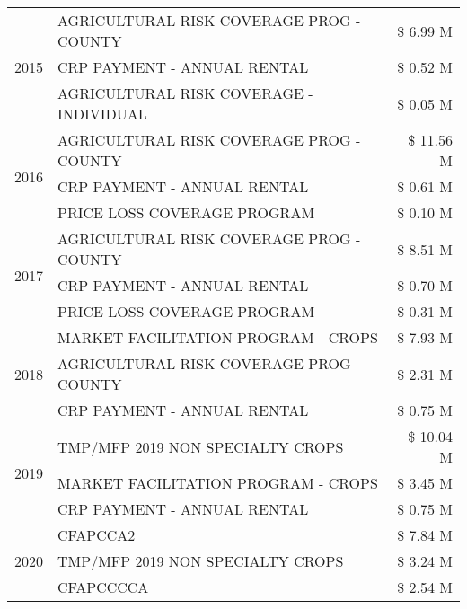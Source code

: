\begin{tabular}{llr}
\cline{1-3}
\multirow[t]{3}{*}{2015} & AGRICULTURAL RISK COVERAGE PROG - COUNTY & \$ 6.99 M \\
 & CRP PAYMENT - ANNUAL RENTAL & \$ 0.52 M \\
 & AGRICULTURAL RISK COVERAGE - INDIVIDUAL & \$ 0.05 M \\
\cline{1-3}
\multirow[t]{3}{*}{2016} & AGRICULTURAL RISK COVERAGE PROG - COUNTY & \$ 11.56 M \\
 & CRP PAYMENT - ANNUAL RENTAL & \$ 0.61 M \\
 & PRICE LOSS COVERAGE PROGRAM & \$ 0.10 M \\
\cline{1-3}
\multirow[t]{3}{*}{2017} & AGRICULTURAL RISK COVERAGE PROG - COUNTY & \$ 8.51 M \\
 & CRP PAYMENT - ANNUAL RENTAL & \$ 0.70 M \\
 & PRICE LOSS COVERAGE PROGRAM & \$ 0.31 M \\
\cline{1-3}
\multirow[t]{3}{*}{2018} & MARKET FACILITATION PROGRAM - CROPS & \$ 7.93 M \\
 & AGRICULTURAL RISK COVERAGE PROG - COUNTY & \$ 2.31 M \\
 & CRP PAYMENT - ANNUAL RENTAL & \$ 0.75 M \\
\cline{1-3}
\multirow[t]{3}{*}{2019} & TMP/MFP 2019 NON SPECIALTY CROPS & \$ 10.04 M \\
 & MARKET FACILITATION PROGRAM - CROPS & \$ 3.45 M \\
 & CRP PAYMENT - ANNUAL RENTAL & \$ 0.75 M \\
\cline{1-3}
\multirow[t]{3}{*}{2020} & CFAPCCA2 & \$ 7.84 M \\
 & TMP/MFP 2019 NON SPECIALTY CROPS & \$ 3.24 M \\
 & CFAPCCCCA & \$ 2.54 M \\
\cline{1-3}
\bottomrule
\end{tabular}
